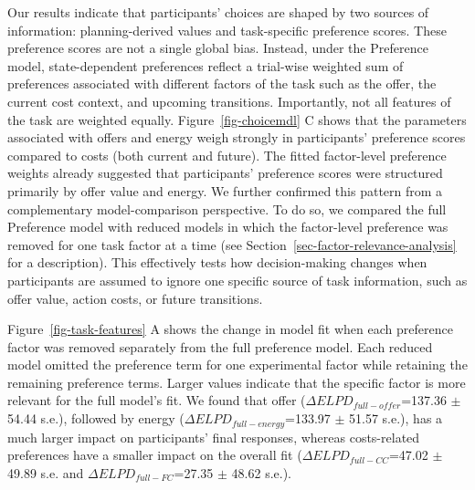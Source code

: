 \documentclass[
  letterpaper,
  DIV=11,
  numbers=noendperiod]{scrartcl}
\begin{document}
Our results indicate that participants' choices are shaped by two
sources of information: planning-derived values and task-specific
preference scores. These preference scores are not a single global bias.
Instead, under the Preference model, state-dependent preferences reflect
a trial-wise weighted sum of preferences associated with different
factors of the task such as the offer, the current cost context, and
upcoming transitions. Importantly, not all features of the task are
weighted equally. Figure~\ref{fig-choicemdl} C shows that the parameters
associated with offers and energy weigh strongly in participants'
preference scores compared to costs (both current and future). The
fitted factor-level preference weights already suggested that
participants' preference scores were structured primarily by offer value
and energy. We further confirmed this pattern from a complementary
model-comparison perspective. To do so, we compared the full Preference
model with reduced models in which the factor-level preference was
removed for one task factor at a time (see
Section~\ref{sec-factor-relevance-analysis} for a description). This
effectively tests how decision-making changes when participants are
assumed to ignore one specific source of task information, such as offer
value, action costs, or future transitions.

Figure~\ref{fig-task-features} A shows the change in model fit when each
preference factor was removed separately from the full preference model.
Each reduced model omitted the preference term for one experimental
factor while retaining the remaining preference terms. Larger values
indicate that the specific factor is more relevant for the full model's
fit. We found that offer (\(\Delta ELPD_{full - offer}\)=137.36 \(\pm\)
54.44 s.e.), followed by energy (\(\Delta ELPD_{full - energy}\)=133.97
\(\pm\) 51.57 s.e.), has a much larger impact on participants' final
responses, whereas costs-related preferences have a smaller impact on
the overall fit (\(\Delta ELPD_{full - CC}\)=47.02 \(\pm\) 49.89 s.e.
and \(\Delta ELPD_{full - FC}\)=27.35 \(\pm\) 48.62 s.e.).
\end{document}
